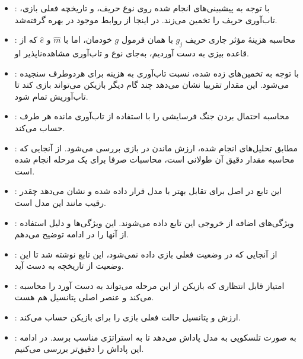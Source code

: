 \documentclass[12pt]{article}
\begin{document}
\begin{itemize}
    \item {}:
    با توجه به پیشبینی‌های انجام شده روی نوع حریف، و تاریخچه فعلی بازی، تاب‌آوری حریف را
    تخمین می‌زند. در اینجا از روابط موجود در 
    بهره گرفته‌شد.

    \item {}:
    محاسبه
    هزینهٔ مؤثر جاری حریف $g_j$
     با همان فرمول $g$
      خودمان،
    اما با $\hat m$
     و $\hat e$ 
     که از قاعده بیزی به دست آوردیم،
     به‌جای نوع و تاب‌آوری مشاهده‌ناپذیر او.

    \item {}:
    با توجه به تخمین‌های زده شده، نسبت تاب‌آوری به هزینه برای هردوطرف سنجیده
    می‌شود. این مقدار تقریبا نشان می‌دهد چند گام دیگر بازیکن می‌تواند بازی کند
    تا تاب‌آوریش تمام شود.

    \item {}:
    محاسبه احتمال بردن جنگ فرسایشی را با استفاده از تاب‌آوری مانده هر طرف حساب می‌کند.

    \item {}:
    مطابق تحلیل‌های انجام شده، ارزش ماندن در بازی بررسی می‌شود. از آنجایی که محاسبه
    مقدار دقیق آن طولانی است، محاسبات صرفا برای یک مرحله انجام شده است.

    \item {}:
    این تابع در اصل برای تقابل بهتر با مدل 
    قرار داده شده و نشان می‌دهد چقدر رقیب مانند این مدل است.

    \item {}:
    ویژگی‌های اضافه از خروجی این تابع داده می‌شوند. این ویژگی‌ها و دلیل استفاده از آنها
    را در ادامه توضیح می‌دهم.

    \item {}:
    از آنجایی که در 
    وضعیت فعلی بازی داده نمی‌شود، این تابع نوشته شد تا این وضعیت از تاریخچه به دست آید.

    \item {}:
    امتیاز قابل انتظاری که بازیکن از این مرحله می‌تواند به دست آورد را محاسبه می‌کند و
    عنصر اصلی پتانسیل هم هست.


    \item {}:
    ارزش و پتانسیل حالت فعلی بازی را برای بازیکن حساب می‌کند.

    \item {}:
    به صورت تلسکوپی به مدل پاداش می‌دهد تا به استراتژی مناسب برسد. در ادامه این پاداش را دقیق‌تر بررسی می‌کنیم.
\end{itemize}
\end{document}

